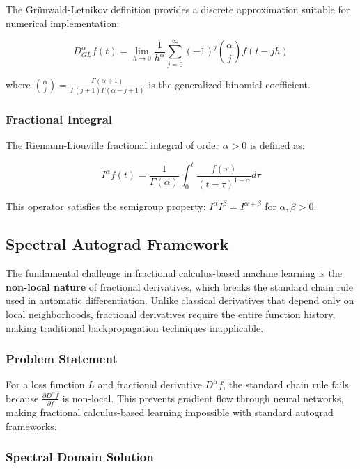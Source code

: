 The Grünwald-Letnikov definition provides a discrete approximation suitable for numerical implementation:

\begin{equation}
D^{\alpha}_{GL} f(t) = \lim_{h \to 0} \frac{1}{h^{\alpha}} \sum_{j=0}^{\infty} (-1)^j \binom{\alpha}{j} f(t-jh)
\end{equation}

where $\binom{\alpha}{j} = \frac{\Gamma(\alpha+1)}{\Gamma(j+1)\Gamma(\alpha-j+1)}$ is the generalized binomial coefficient.

\subsubsection{Fractional Integral}

The Riemann-Liouville fractional integral of order $\alpha > 0$ is defined as:

\begin{equation}
I^{\alpha} f(t) = \frac{1}{\Gamma(\alpha)} \int_0^t \frac{f(\tau)}{(t-\tau)^{1-\alpha}} d\tau
\end{equation}

This operator satisfies the semigroup property: $I^{\alpha} I^{\beta} = I^{\alpha+\beta}$ for $\alpha, \beta > 0$.

\subsection{Spectral Autograd Framework}

The fundamental challenge in fractional calculus-based machine learning is the \textbf{non-local nature} of fractional derivatives, which breaks the standard chain rule used in automatic differentiation. Unlike classical derivatives that depend only on local neighborhoods, fractional derivatives require the entire function history, making traditional backpropagation techniques inapplicable.

\subsubsection{Problem Statement}

For a loss function $L$ and fractional derivative $D^{\alpha} f$, the standard chain rule fails because $\frac{\partial D^{\alpha} f}{\partial f}$ is non-local. This prevents gradient flow through neural networks, making fractional calculus-based learning impossible with standard autograd frameworks.

\subsubsection{Spectral Domain Solution}

